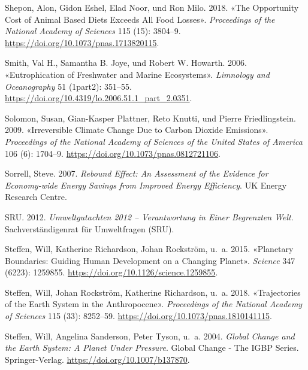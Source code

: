 \documentclass[
  nswissgerman,
  a4paper,
  openany]{book}
\newlength{\cslhangindent}
\newenvironment{CSLReferences}[2] %
 {\begin{list}{}{%
  \setlength{\itemindent}{0pt}
  \setlength{\leftmargin}{0pt}
  \setlength{\parsep}{0pt}
  \ifodd #1
   \setlength{\leftmargin}{\cslhangindent}
   \setlength{\itemindent}{-1\cslhangindent}
  \fi
  \setlength{\itemsep}{#2\baselineskip}}}
 {\end{list}}
\begin{document}
\begin{CSLReferences}{1}{1}
Shepon, Alon, Gidon Eshel, Elad Noor, und Ron Milo. 2018. {«The
Opportunity Cost of Animal Based Diets Exceeds All Food Losses»}.
\emph{Proceedings of the National Academy of Sciences} 115 (15):
3804--9. \url{https://doi.org/10.1073/pnas.1713820115}.

Smith, Val H., Samantha B. Joye, und Robert W. Howarth. 2006.
{«Eutrophication of Freshwater and Marine Ecosystems»}. \emph{Limnology
and Oceanography} 51 (1part2): 351--55.
\url{https://doi.org/10.4319/lo.2006.51.1_part_2.0351}.

Solomon, Susan, Gian-Kasper Plattner, Reto Knutti, und Pierre
Friedlingstein. 2009. {«Irreversible Climate Change Due to Carbon
Dioxide Emissions»}. \emph{Proceedings of the National Academy of
Sciences of the United States of America} 106 (6): 1704--9.
\url{https://doi.org/10.1073/pnas.0812721106}.

Sorrell, Steve. 2007. \emph{Rebound {Effect}: {An Assessment} of the
{Evidence} for {Economy-wide Energy Savings} from {Improved Energy
Efficiency}}. UK Energy Research Centre.

SRU. 2012. \emph{Umweltgutachten 2012 -- {Verantwortung} in Einer
Begrenzten {Welt}}. Sachverständigenrat für Umweltfragen (SRU).

{Steffen, Will, Katherine Richardson, Johan Rockström, u.~a.} 2015.
{«Planetary Boundaries: {Guiding} Human Development on a Changing
Planet»}. \emph{Science} 347 (6223): 1259855.
\url{https://doi.org/10.1126/science.1259855}.

Steffen, Will, Johan Rockström, Katherine Richardson, u.~a. 2018.
{«Trajectories of the {Earth System} in the {Anthropocene}»}.
\emph{Proceedings of the National Academy of Sciences} 115 (33):
8252--59. \url{https://doi.org/10.1073/pnas.1810141115}.

Steffen, Will, Angelina Sanderson, Peter Tyson, u.~a. 2004. \emph{Global
{Change} and the {Earth System}: {A Planet Under Pressure}}. Global
{Change} - {The IGBP Series}. Springer-Verlag.
\url{https://doi.org/10.1007/b137870}.


\end{CSLReferences}
\end{document}
